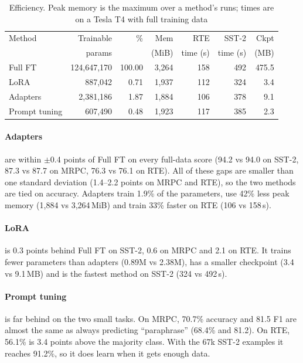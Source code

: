 \documentclass{nle}
\begin{document}
\begin{table}
  \caption{Efficiency. Peak memory is the maximum over a method's runs; times are on a Tesla T4 with full training data}
  \label{tab:eff}
  \begin{minipage}{\textwidth}\footnotesize
    \begin{tabular}{lrrrrrr}
    \hline\hline
    Method & Trainable & \% & Mem & RTE & SST-2 & Ckpt \\
     & params & & (MiB) & time (s) & time (s) & (MB) \\
    \hline
    Full FT & 124,647,170 & 100.00 & 3,264 & 158 & 492 & 475.5 \\
    LoRA & 887,042 & 0.71 & 1,937 & 112 & 324 & 3.4 \\
    Adapters & 2,381,186 & 1.87 & 1,884 & 106 & 378 & 9.1 \\
    Prompt tuning & 607,490 & 0.48 & 1,923 & 117 & 385 & 2.3 \\
    \hline\hline
    \end{tabular}
  \end{minipage}
\end{table}

\paragraph{Adapters} are within $\pm$0.4 points of Full FT on every full-data score (94.2 vs 94.0 on SST-2, 87.3 vs 87.7 on MRPC, 76.3 vs 76.1 on RTE). All of these gaps are smaller than one standard deviation (1.4--2.2 points on MRPC and RTE), so the two methods are tied on accuracy. Adapters train 1.9\% of the parameters, use 42\% less peak memory (1,884 vs 3,264\,MiB) and train 33\% faster on RTE (106 vs 158\,s).

\paragraph{LoRA} is 0.3 points behind Full FT on SST-2, 0.6 on MRPC and 2.1 on RTE. It trains fewer parameters than adapters (0.89M vs 2.38M), has a smaller checkpoint (3.4 vs 9.1\,MB) and is the fastest method on SST-2 (324 vs 492\,s).

\paragraph{Prompt tuning} is far behind on the two small tasks. On MRPC, 70.7\% accuracy and 81.5 F1 are almost the same as always predicting ``paraphrase'' (68.4\% and 81.2). On RTE, 56.1\% is 3.4 points above the majority class. With the 67k SST-2 examples it reaches 91.2\%, so it does learn when it gets enough data.
\end{document}
